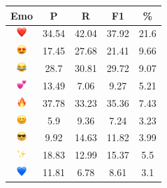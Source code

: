 \documentclass{article}
\begin{document}
\begin{table}
\centering
\begin{tabular}{|c|ccc|c|} \hline
\textbf{Emo} & \textbf{P} & \textbf{R} & \textbf{F1} & \textbf{\%} \\ \hline
\includegraphics[height=0.37cm,width=0.37cm]{img/red_heart.png} & 34.54 & 42.04 & 37.92 & 21.6\\ 
\includegraphics[height=0.37cm,width=0.37cm]{img/smiling_face_with_hearteyes.png} & 17.45 & 27.68 & 21.41 & 9.66\\ 
\includegraphics[height=0.37cm,width=0.37cm]{img/face_with_tears_of_joy.png} & 28.7 & 30.81 & 29.72 & 9.07\\ 
\includegraphics[height=0.37cm,width=0.37cm]{img/two_hearts.png} & 13.49 & 7.06 & 9.27 & 5.21\\ 
\includegraphics[height=0.37cm,width=0.37cm]{img/fire.png} & 37.78 & 33.23 & 35.36 & 7.43\\ 
\includegraphics[height=0.37cm,width=0.37cm]{img/smiling_face_with_smiling_eyes.png} & 5.9 & 9.36 & 7.24 & 3.23\\ 
\includegraphics[height=0.37cm,width=0.37cm]{img/smiling_face_with_sunglasses.png} & 9.92 & 14.63 & 11.82 & 3.99\\ 
\includegraphics[height=0.37cm,width=0.37cm]{img/sparkles.png} & 18.83 & 12.99 & 15.37 & 5.5\\ 
\includegraphics[height=0.37cm,width=0.37cm]{img/blue_heart.png} & 11.81 & 6.78 & 8.61 & 3.1\\ 

\end{tabular}
\end{table}
\end{document}
